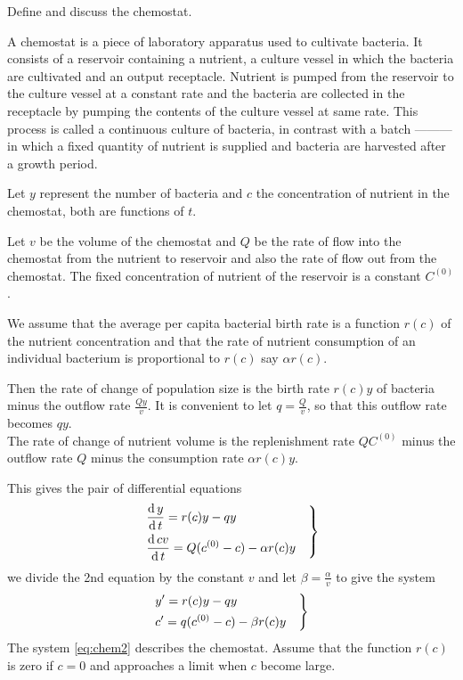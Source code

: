 \documentclass[../main-sheet.tex]{subfiles}
\begin{document}
\begin{prob}
    Define and discuss the chemostat.
\end{prob}
\begin{soln}
    A chemostat is a piece of laboratory apparatus used to cultivate bacteria. It consists of a reservoir containing a nutrient, a culture vessel in which the bacteria are cultivated and an output receptacle. Nutrient is pumped from the reservoir to the culture vessel at a constant rate and the bacteria are collected in the receptacle by pumping the contents of the culture vessel at same rate. This process is called a continuous culture of bacteria, in contrast with a batch --------- in which a fixed quantity of nutrient is supplied and bacteria are harvested after a growth period.

    Let \(y\) represent the number of bacteria and \(c\) the concentration of nutrient in the chemostat, both are functions of \(t\).

    Let \(v\) be the volume of the chemostat and \(Q\) be the rate of flow into the chemostat from the nutrient to reservoir and also the rate of flow out from the chemostat. The fixed concentration of nutrient of the reservoir is a constant \(C^{(0)}\).

    We assume that the average per capita bacterial birth rate is a function \(r(c)\) of the nutrient concentration and that the rate of nutrient consumption of an individual bacterium is proportional to \(r(c)\) say \(\alpha r(c)\).

    Then the rate of change of population size is the birth rate \(r(c)y\) of bacteria minus the outflow rate \(\frac{Qy}{v}\). It is convenient to let \(q=\frac{Q}{v}\), so that this outflow rate becomes \(qy\).\\
    The rate of change of nutrient volume is the replenishment rate \(QC^{(0)}\) minus the outflow rate \(Q\) minus the consumption rate \(\alpha r(c)y\).

    This gives the pair of differential equations
    \begin{equation}
        \begin{rcases}
            \displaystyle\,\frac{\mathrm{d}\,y}{\mathrm{d}\,t}=r(c)y-qy\quad\\
            \displaystyle\,\frac{\mathrm{d}\,cv}{\mathrm{d}\,t}=Q(c^{(0)}-c) -\alpha r(c)y\quad   
        \end{rcases}
        \label{eq:chem1}
    \end{equation}
    we divide the 2nd equation by the constant \(v\) and let \(\beta=\frac{\alpha}{v}\) to give the system 
    \begin{equation}
        \begin{rcases}
            \displaystyle y'=r(c)y-qy\quad\\
            \displaystyle c'=q(c^{(0)}-c) -\beta r(c)y\quad   
        \end{rcases}
        \label{eq:chem2}
    \end{equation}
    The system \eqref{eq:chem2} describes the chemostat. Assume that the function \(r(c)\) is zero if \(c=0\) and approaches a limit when \(c\) become large.
    

\end{soln}
\end{document}

